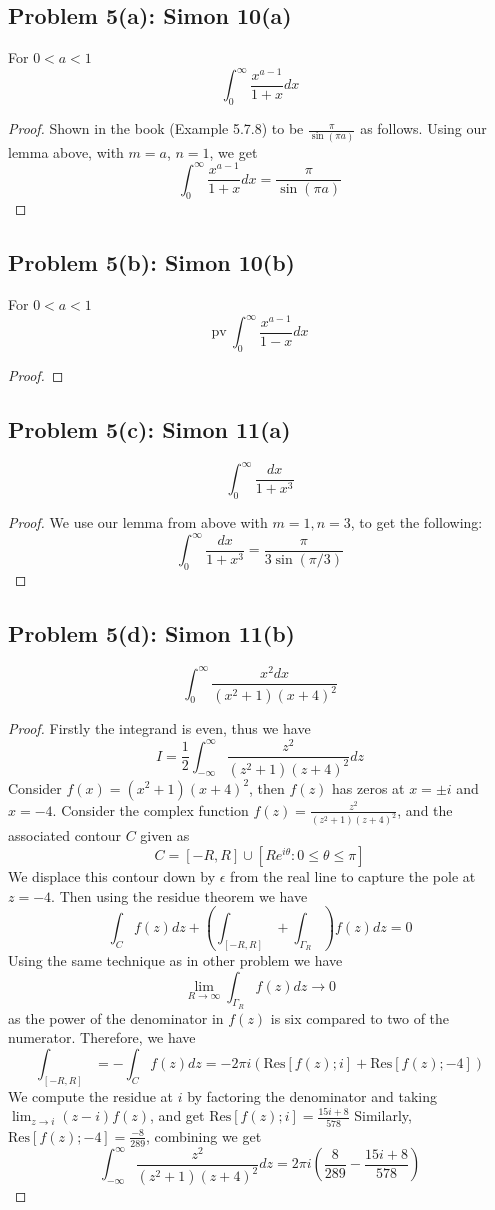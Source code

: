 \documentclass{article}[12pt]
\begin{document}
\subsection*{Problem 5(a): Simon 10(a)} For $0 < a < 1$
\[
\int_0^\infty \frac{x^{a-1}}{1+x} dx
\]
\begin{proof}
Shown in the book (Example 5.7.8) to be $\frac{\pi}{\sin(\pi a)}$
as follows. Using our lemma above, with $m=a$, $n=1$, we get
\[
\int_0^\infty \frac{x^{a-1}}{1+x} dx = \frac{\pi}{\sin(\pi a)}
\]
\end{proof}

\subsection*{Problem 5(b): Simon 10(b)} For $0 < a < 1$
\[
\mbox{pv}\ \int_0^\infty \frac{x^{a-1}}{1-x}dx
\]
\begin{proof}

\end{proof}

\subsection*{Problem 5(c): Simon 11(a)}
\[
\int_0^\infty \frac{dx}{1+x^3}
\]
\begin{proof}
We use our lemma from above with $m=1,n=3$, to get the following:
\[
\int_0^\infty \frac{dx}{1+x^3} = \frac{\pi}{3\sin(\pi/3)}
\]
\end{proof}


\subsection*{Problem 5(d): Simon 11(b)}
\[
\int_0^\infty \frac{x^2 dx}{(x^2+1)(x+4)^2}
\]
\begin{proof}
Firstly the integrand is even, thus we have
\[
I = \frac{1}{2} \int_{-\infty}^\infty \frac{z^2}{(z^2+1)(z+4)^2} dz
\]
Consider $f(x)=(x^2+1)(x+4)^2$, then $f(z)$ has zeros
at $x=\pm i$ and $x=-4$. Consider the complex function
$f(z)=\frac{z^2}{(z^2+1)(z+4)^2}$, and the associated contour
$C$ given as 
\[
C=[-R,R] \cup [Re^{i\theta}:0 \le \theta \le \pi]
\]
We displace this contour down by $\epsilon$ from the real line
to capture the pole at $z=-4$. Then using the residue theorem we have
\[
\int_C f(z)dz + \left( \int_{[-R,R]} + \int_{\Gamma_R}\right) f(z) dz = 0
\]
Using the same technique as in other problem we have 
\[
\lim_{R\to\infty} \int_{\Gamma_R} f(z)dz \to 0
\]
as the power of the denominator in $f(z)$ is six compared to two
of the numerator. Therefore, we have
\[
\int_{[-R,R]} = - \int_C f(z)dz  = -2\pi i(\mbox{Res}[f(z);i]+\mbox{Res}[f(z);-4])
\]
We compute the residue at $i$ by factoring the denominator and
taking $\lim_{z\to i} (z-i)f(z)$, and get
$\mbox{Res}[f(z);i] = \frac{15i+8}{578}$
Similarly, $\mbox{Res}[f(z);-4] = \frac{-8}{289}$, combining we get
\[
\int_{-\infty}^\infty \frac{z^2}{(z^2+1)(z+4)^2}dz = 2\pi i
( \frac{8}{289} - \frac{15i+8}{578})
\]
\end{proof}
\end{document}
